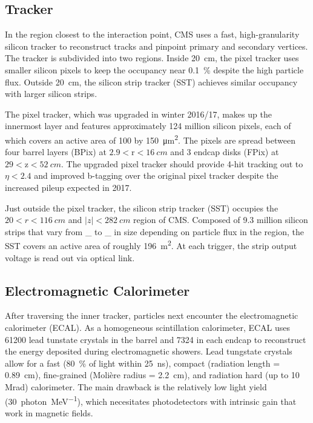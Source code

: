 \documentclass[12pt]{article}
\begin{document}
    \subsection{Tracker}
        In the region closest to the interaction point, CMS uses a fast, high-granularity silicon tracker to reconstruct tracks and pinpoint primary and secondary vertices. The tracker is subdivided into two regions. Inside \SI{20}{cm}, the pixel tracker  uses smaller silicon pixels to keep the occupancy near \SI{0.1}{\percent} despite the high particle flux. Outside \SI{20}{\cm}, the silicon strip tracker (SST) achieves similar occupancy with larger silicon strips.  

        The pixel tracker, which was upgraded in winter 2016/17, makes up the innermost layer and features approximately \num{124} million silicon pixels, each of which covers an active area of \num{100} by \SI{150}{\micro\meter^2}. The pixels are spread between four barrel layers (BPix) at $\num{2.9}<\mathrm{r}<\SI{16}{cm}$ and 3 endcap disks (FPix) at $\num{29} < \mathrm{z} < \SI{52}{cm}$. The upgraded pixel tracker should provide 4-hit tracking out to $\eta < \num{2.4}$ and improved b-tagging over the original pixel tracker despite the increased pileup expected in 2017.
        
        Just outside the pixel tracker, the silicon strip tracker (SST) occupies the $\num{20} < r < \SI{116}{cm}$ and $\lvert z \rvert < \SI{282}{cm}$ region of CMS. Composed of \num{9.3} million silicon strips that vary from \_ to \_ in size  depending on particle flux in the region, the SST covers an active area of roughly \SI{196}{m^2}. At each trigger, the strip output voltage is read out via optical link.

    \subsection{Electromagnetic Calorimeter}
        After traversing the inner tracker, particles next encounter the electromagnetic calorimeter (ECAL). As a homogeneous scintillation calorimeter, ECAL uses \num{61200} lead tunstate crystals in the barrel and \num{7324} in each endcap to reconstruct the energy deposited during electromagnetic showers. Lead tungstate crystals allow for a fast (\SI{80}{\percent} of light within \SI{25}{ns}), compact (radiation length = \SI{0.89}{cm}), fine-grained (Moli\`ere radius = \SI{2.2}{cm}), and radiation hard (up to 10 Mrad) calorimeter. The main drawback is the relatively low light yield (\SI{30}{photon\per\mega\electronvolt}), which necesitates photodetectors with intrinsic gain that work in magnetic fields.
\end{document}

